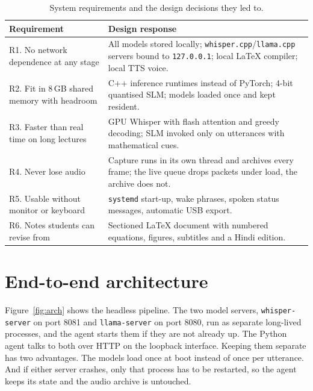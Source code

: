 \documentclass[11pt,a4paper,oneside]{report}
\theoremstyle{definition}
\newcommand{\code}[1]{\texttt{\small #1}}
\begin{document}
\begin{table}[ht]
\centering\small
\caption{System requirements and the design decisions they led to.}
\label{tab:req}
\begin{tabularx}{\textwidth}{@{}>{\raggedright\arraybackslash}p{}X@{}}
\toprule
\textbf{Requirement} & \textbf{Design response} \\
\midrule
R1. No network dependence at any stage & All models stored locally; \texttt{whisper.cpp}/\texttt{llama.cpp} servers bound to \texttt{127.0.0.1}; local LaTeX compiler; local TTS voice. \\
R2. Fit in 8\,GB shared memory with headroom & C++ inference runtimes instead of PyTorch; 4-bit quantised SLM; models loaded once and kept resident. \\
R3. Faster than real time on long lectures & GPU Whisper with flash attention and greedy decoding; SLM invoked only on utterances with mathematical cues. \\
R4. Never lose audio & Capture runs in its own thread and archives every frame; the live queue drops packets under load, the archive does not. \\
R5. Usable without monitor or keyboard & \texttt{systemd} start-up, wake phrases, spoken status messages, automatic USB export. \\
R6. Notes students can revise from & Sectioned LaTeX document with numbered equations, figures, subtitles and a Hindi edition. \\
\bottomrule
\end{tabularx}
\end{table}

\section{End-to-end architecture}
Figure~\ref{fig:arch} shows the headless pipeline. The two model servers, \code{whisper-server} on port 8081 and \code{llama-server} on port 8080, run as separate long-lived processes, and the agent starts them if they are not already up. The Python agent talks to both over HTTP on the loopback interface. Keeping them separate has two advantages. The models load once at boot instead of once per utterance. And if either server crashes, only that process has to be restarted, so the agent keeps its state and the audio archive is untouched.
\end{document}
